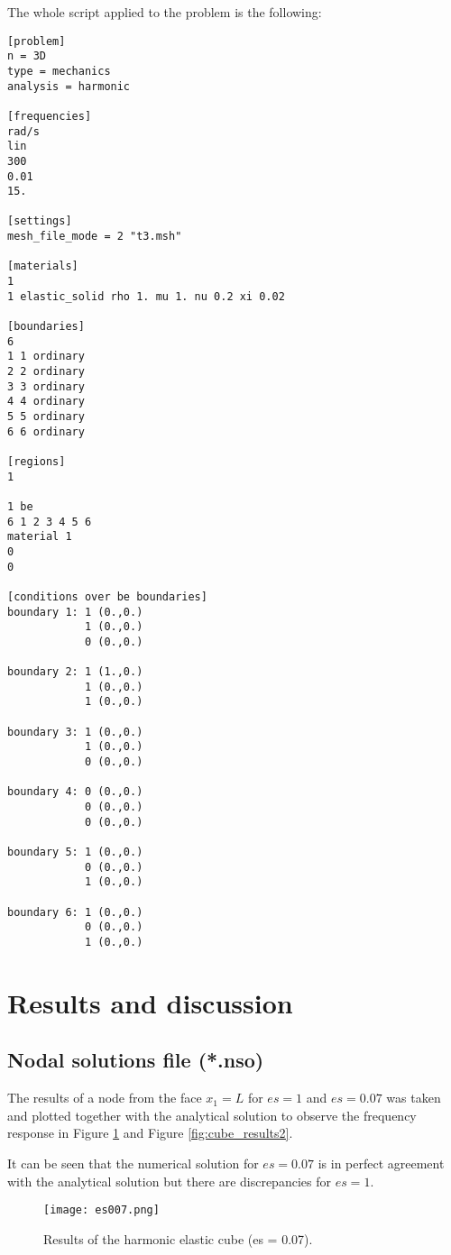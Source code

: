 \documentclass[a4]{article}
\begin{document}
The whole script applied to the problem is the following:

\begin{Verbatim}
[problem]
n = 3D
type = mechanics
analysis = harmonic

[frequencies]
rad/s
lin
300
0.01
15.

[settings]
mesh_file_mode = 2 "t3.msh"

[materials]
1
1 elastic_solid rho 1. mu 1. nu 0.2 xi 0.02

[boundaries]
6
1 1 ordinary
2 2 ordinary
3 3 ordinary
4 4 ordinary
5 5 ordinary
6 6 ordinary

[regions]
1

1 be
6 1 2 3 4 5 6
material 1
0
0

[conditions over be boundaries]
boundary 1: 1 (0.,0.)
            1 (0.,0.)
            0 (0.,0.)

boundary 2: 1 (1.,0.)
            1 (0.,0.)
            1 (0.,0.)

boundary 3: 1 (0.,0.)
            1 (0.,0.)
            0 (0.,0.)

boundary 4: 0 (0.,0.)
            0 (0.,0.)
            0 (0.,0.)

boundary 5: 1 (0.,0.)
            0 (0.,0.)
            1 (0.,0.)

boundary 6: 1 (0.,0.)
            0 (0.,0.)
            1 (0.,0.)
\end{Verbatim}

\section{Results and discussion}

\subsection{Nodal solutions file (*.nso)}
The results of a node from the face $x_1=L$ for $es=1$ and $es=0.07$ was taken and plotted together with the analytical solution to observe the frequency response in Figure \ref{fig:cube_results} and Figure \ref{fig:cube_results2}.

It can be seen that the numerical solution for $es=0.07$ is in perfect agreement with the analytical solution but there are discrepancies for $es=1$.

\begin{figure}[h]
	\centering
	\texttt{[image: es007.png]}
	\caption{Results of the harmonic elastic cube (es = 0.07).}
	\label{fig:cube_results}
\end{figure}
\end{document}
